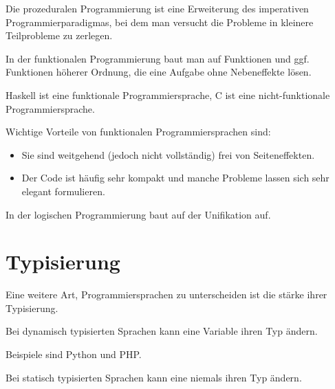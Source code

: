 \begin{definition}
    Die prozeduralen Programmierung ist eine Erweiterung des imperativen
    Programmierparadigmas, bei dem man versucht die Probleme in 
    kleinere Teilprobleme zu zerlegen.
\end{definition}

\begin{definition}
    In der funktionalen Programmierung baut man auf Funktionen und
    ggf. Funktionen höherer Ordnung, die eine Aufgabe ohne Nebeneffekte
    lösen.
\end{definition}

Haskell ist eine funktionale Programmiersprache, C ist eine
nicht-funktionale Programmiersprache.

Wichtige Vorteile von funktionalen Programmiersprachen sind:
\begin{itemize}
    \item Sie sind weitgehend (jedoch nicht vollständig) frei von Seiteneffekten.
    \item Der Code ist häufig sehr kompakt und manche Probleme lassen
          sich sehr elegant formulieren.
\end{itemize}

\begin{definition}
    In der logischen Programmierung baut auf der Unifikation auf.
\end{definition}

\section{Typisierung}
Eine weitere Art, Programmiersprachen zu unterscheiden ist die stärke
ihrer Typisierung.

\begin{definition}
    Bei dynamisch typisierten Sprachen kann eine Variable ihren Typ ändern.
\end{definition}

Beispiele sind Python und PHP.

\begin{definition}
    Bei statisch typisierten Sprachen kann eine niemals ihren Typ ändern.
\end{definition}

